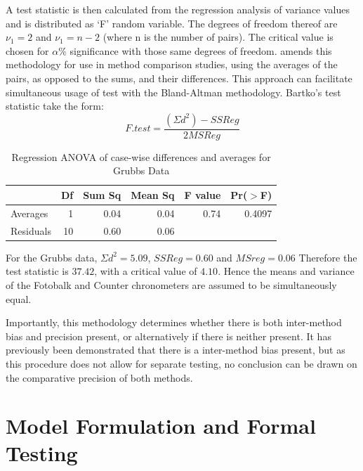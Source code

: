 \documentclass[12pt, a4paper]{report}
\theoremstyle{plain}
\theoremstyle{definition}
\theoremstyle{remark}
\begin{document}
		A test statistic is then calculated from the regression analysis
		of variance values \citep{BB89} and is distributed as `F' random
		variable. The degrees of freedom thereof are $\nu_{1}=2$ and
		$\nu_{1}=n-2$ (where n is the number of pairs). The critical value
		is chosen for $\alpha\%$ significance with those same degrees of
		freedom. \citet{Bartko} amends this methodology for use in method
		comparison studies, using the averages of the pairs, as opposed to
		the sums, and their differences. This approach can facilitate
		simultaneous usage of test with the Bland-Altman methodology.
		Bartko's test statistic take the form:
		\begin{equation} F.test = \frac{(\Sigma d^{2})-SSReg}{2MSReg}
		\end{equation}
		\begin{table}[ht]
			\begin{center}
				\begin{tabular}{lrrrrr}
					\hline
					& Df & Sum Sq & Mean Sq & F value & Pr($>$F) \\
					\hline
					Averages & 1 & 0.04 & 0.04 & 0.74 & 0.4097 \\
					Residuals & 10 & 0.60 & 0.06 &  &  \\
					\hline
				\end{tabular}
				\caption{Regression ANOVA of case-wise differences and averages
					for Grubbs Data}
			\end{center}
		\end{table}
		
		For the Grubbs data, $\Sigma d^{2}=5.09 $, $SSReg = 0.60$ and
		$MSreg=0.06$ Therefore the test statistic is $37.42$, with a
		critical value of $4.10$. Hence the means and variance of the
		Fotobalk and Counter chronometers are assumed to be simultaneously
		equal.
		
		Importantly, this methodology determines whether there is both
		inter-method bias and precision present, or alternatively if there
		is neither present. It has previously been demonstrated that there
		is a inter-method bias present, but as this procedure does not
		allow for separate testing, no conclusion can be drawn on the
		comparative precision of both methods.
		
	
		\section{Model Formulation and Formal Testing}
		
\end{document}
